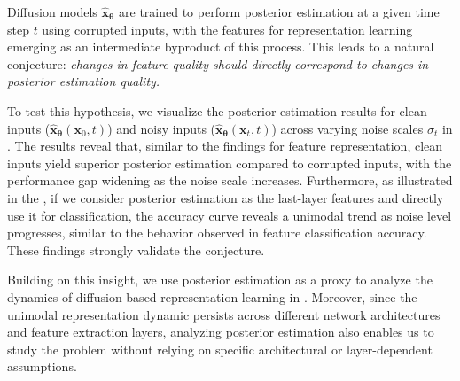 Diffusion models $\hat{\bm{x}}_{\bm{\theta}}$ are trained to perform posterior estimation at a given time step $t$ using corrupted inputs, with the features for representation learning emerging as an intermediate byproduct of this process. This leads to a natural conjecture:
\emph{changes in feature quality should directly correspond to changes in posterior estimation quality.}



To test this hypothesis, we visualize the posterior estimation results for clean inputs ($\hat{\bm{x}}_{\bm{\theta}}(\bm{x}_0, t)$) and noisy inputs ($\hat{\bm{x}}_{\bm{\theta}}(\bm{x}_t, t)$) across varying noise scales $\sigma_t$ in . The results reveal that, similar to the findings for feature representation, clean inputs yield superior posterior estimation compared to corrupted inputs, with the performance gap widening as the noise scale increases. Furthermore, as illustrated in the , if we consider posterior estimation as the last-layer features and directly use it for classification, the accuracy curve reveals a unimodal trend as noise level progresses, similar to the behavior observed in feature classification accuracy. These findings strongly validate the conjecture. 

Building on this insight, we use posterior estimation as a proxy to analyze the dynamics of diffusion-based representation learning in . Moreover, since the unimodal representation dynamic persists across different network architectures and feature extraction layers, analyzing posterior estimation also enables us to study the problem without relying on specific architectural or layer-dependent assumptions.

